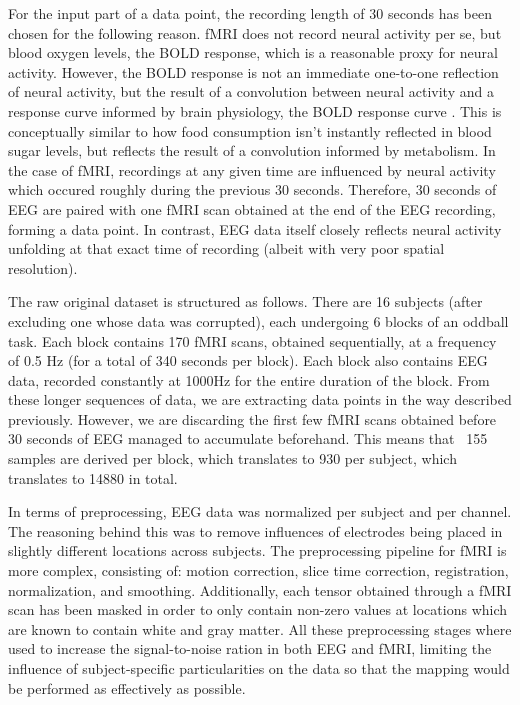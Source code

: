 \documentclass{article}
\begin{document}
For the input part of a data point, the recording length of 30 seconds has been chosen for the following reason. fMRI does not record neural activity per se, but blood oxygen levels, the BOLD response, which is a reasonable proxy for neural activity. However, the BOLD response is not an immediate one-to-one reflection of neural activity, but the result of a convolution between neural activity and a response curve informed by brain physiology, the BOLD response curve \cite{noauthor_functional_1993}. This is conceptually similar to how food consumption isn't instantly reflected in blood sugar levels, but reflects the result of a convolution informed by metabolism. In the case of fMRI, recordings at any given time are influenced by neural activity which occured roughly during the previous 30 seconds. Therefore, 30 seconds of EEG are paired with one fMRI scan obtained at the end of the EEG recording, forming a data point. In contrast, EEG data itself closely reflects neural activity unfolding at that exact time of recording (albeit with very poor spatial resolution).

The raw original dataset is structured as follows. There are 16 subjects (after excluding one whose data was corrupted), each undergoing 6 blocks of an oddball task. Each block contains 170 fMRI scans, obtained sequentially, at a frequency of 0.5 Hz (for a total of 340 seconds per block). Each block also contains EEG data, recorded constantly at 1000Hz for the entire duration of the block. From these longer sequences of data, we are extracting data points in the way described previously. However, we are discarding the first few fMRI scans obtained before 30 seconds of EEG managed to accumulate beforehand. This means that ~155 samples are derived per block, which translates to 930 per subject, which translates to 14880 in total.

In terms of preprocessing, EEG data was normalized per subject and per channel. The reasoning behind this was to remove influences of electrodes being placed in slightly different locations across subjects. The preprocessing pipeline for fMRI is more complex, consisting of: motion correction, slice time correction, registration, normalization, and smoothing. Additionally, each tensor obtained through a fMRI scan has been masked in order to only contain non-zero values at locations which are known to contain white and gray matter. All these preprocessing stages where used to increase the signal-to-noise ration in both EEG and fMRI, limiting the influence of subject-specific particularities on the data so that the mapping would be performed as effectively as possible.
\end{document}
